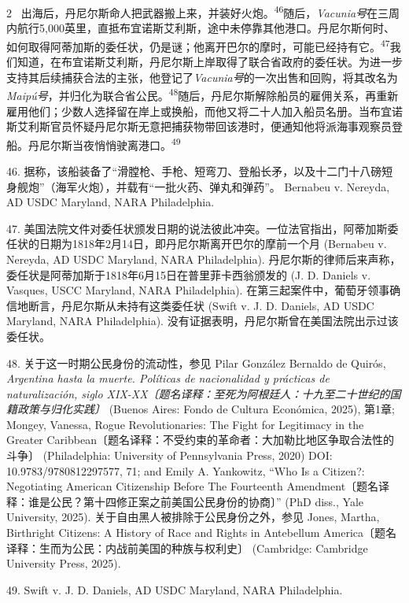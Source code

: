 \documentclass[10pt,a4paper]{article}
\begin{document}
\begin{paracol}{2}
\switchcolumn*
{\scriptsize\color{gray} [p. 12]}\ 出海后，丹尼尔斯命人把武器搬上来，并装好火\mbox{炮。\textsuperscript{46}}随后，\textit{Vacunia号}在三周内航行5,000英里，直抵布宜诺斯艾利斯，途中未停靠其他港口。丹尼尔斯何时、如何取得阿蒂加斯的委任状，仍是谜；他离开巴尔的摩时，可能已经持有\mbox{它。\textsuperscript{47}}我们知道，在布宜诺斯艾利斯，丹尼尔斯上岸取得了联合省政府的委任状。为进一步支持其后续捕获合法的主张，他登记了\textit{Vacunia号}的一次出售和回购，将其改名为\textit{Maipú号}，并归化为联合省公\mbox{民。\textsuperscript{48}}随后，丹尼尔斯解除船员的雇佣关系，再重新雇用他们；少数人选择留在岸上或换船，而他又将二十人加入船员名册。当布宜诺斯艾利斯官员怀疑丹尼尔斯无意把捕获物带回该港时，便通知他将派海事观察员登船。丹尼尔斯当夜悄悄驶离港\mbox{口。\textsuperscript{49}}\par{\small 46. 据称，该船装备了“滑膛枪、手枪、短弯刀、登船长矛，以及十二门十八磅短身舰炮”（海军火炮），并载有“一批火药、弹丸和弹药”。 Bernabeu v. Nereyda, AD USDC Maryland, NARA Philadelphia.\par}{\small 47. 美国法院文件对委任状颁发日期的说法彼此冲突。一位法官指出，阿蒂加斯委任状的日期为1818年2月14日，即丹尼尔斯离开巴尔的摩前一个月 (Bernabeu v. Nereyda, AD USDC Maryland, NARA Philadelphia). 丹尼尔斯的律师后来声称，委任状是阿蒂加斯于1818年6月15日在普里菲卡西翁颁发的 (J. D. Daniels v. Vasques, USCC Maryland, NARA Philadelphia). 在第三起案件中，葡萄牙领事确信地断言，丹尼尔斯从未持有这类委任状 (Swift v. J. D. Daniels, AD USDC Maryland, NARA Philadelphia). 没有证据表明，丹尼尔斯曾在美国法院出示过该委任状。\par}{\small 48. 关于这一时期公民身份的流动性，参见 Pilar González Bernaldo de Quirós, \textit{Argentina hasta la muerte. Políticas de nacionalidad y prácticas de naturalización, siglo XIX-XX〔题名译释：至死为阿根廷人：十九至二十世纪的国籍政策与归化实践〕} (Buenos Aires: Fondo de Cultura Económica, 2025), 第1章; Mongey, Vanessa, Rogue Revolutionaries: The Fight for Legitimacy in the Greater Caribbean〔题名译释：不受约束的革命者：大加勒比地区争取合法性的斗争〕 (Philadelphia: University of Pennsylvania Press, 2020) DOI: 10.9783/9780812297577, 71; and Emily A. Yankowitz, “Who Is a Citizen?: Negotiating American Citizenship Before The Fourteenth Amendment〔题名译释：谁是公民？第十四修正案之前美国公民身份的协商〕” (PhD diss., Yale University, 2025). 关于自由黑人被排除于公民身份之外，参见 Jones, Martha, Birthright Citizens: A History of Race and Rights in Antebellum America〔题名译释：生而为公民：内战前美国的种族与权利史〕 (Cambridge: Cambridge University Press, 2025).\par}{\small 49. Swift v. J. D. Daniels, AD USDC Maryland, NARA Philadelphia.\par}

\end{paracol}
\end{document}
